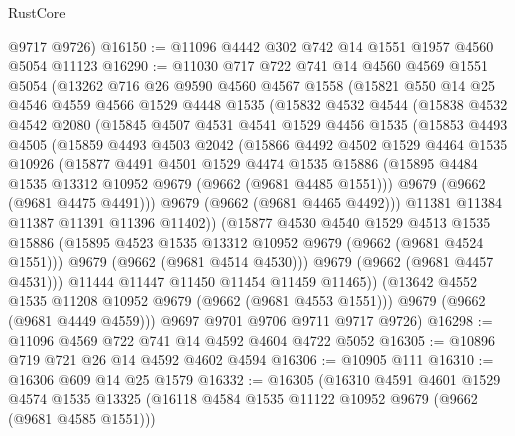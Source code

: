 \begin{lexlean}{RustCore}
\begin{coremodule}
      @9717
      @9726)
@16150 := @11096 @4442 @302 @742 @14 @1551 @1957 @4560 @5054 @11123
@16290 := @11030
    @717
    @722
    @741
    @14
    @4560
    @4569
    @1551
    @5054
    (@13262
      @716
      @26
      @9590
      @4560
      @4567
      @1558
      (@15821
        @550
        @14
        @25
        @4546
        @4559
        @4566
        @1529
        @4448
        @1535
        (@15832
          @4532
          @4544
          (@15838
            @4532
            @4542
            @2080
            (@15845
              @4507
              @4531
              @4541
              @1529
              @4456
              @1535
              (@15853
                @4493
                @4505
                (@15859
                  @4493
                  @4503
                  @2042
                  (@15866
                    @4492
                    @4502
                    @1529
                    @4464
                    @1535
                    @10926
                    (@15877
                      @4491
                      @4501
                      @1529
                      @4474
                      @1535
                      @15886
                      (@15895 @4484 @1535 @13312 @10952 @9679 (@9662 (@9681 @4485 @1551)))
                      @9679
                      (@9662 (@9681 @4475 @4491)))
                    @9679
                    (@9662 (@9681 @4465 @4492)))
                  @11381
                  @11384
                  @11387
                  @11391
                  @11396
                  @11402))
              (@15877
                @4530
                @4540
                @1529
                @4513
                @1535
                @15886
                (@15895 @4523 @1535 @13312 @10952 @9679 (@9662 (@9681 @4524 @1551)))
                @9679
                (@9662 (@9681 @4514 @4530)))
              @9679
              (@9662 (@9681 @4457 @4531)))
            @11444
            @11447
            @11450
            @11454
            @11459
            @11465))
        (@13642 @4552 @1535 @11208 @10952 @9679 (@9662 (@9681 @4553 @1551)))
        @9679
        (@9662 (@9681 @4449 @4559)))
      @9697
      @9701
      @9706
      @9711
      @9717
      @9726)
@16298 := @11096 @4569 @722 @741 @14 @4592 @4604 @4722 @5052
@16305 := @10896 @719 @721 @26 @14 @4592 @4602 @4594
@16306 := @10905 @111
@16310 := @16306 @609 @14 @25 @1579
@16332 := @16305
    (@16310
      @4591
      @4601
      @1529
      @4574
      @1535
      @13325
      (@16118 @4584 @1535 @11122 @10952 @9679 (@9662 (@9681 @4585 @1551)))

\end{coremodule}
\end{lexlean}
